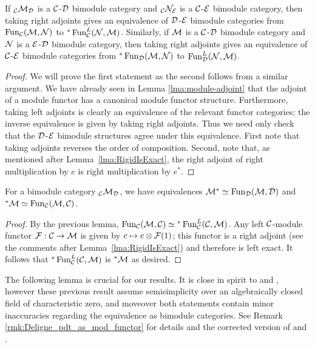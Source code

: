 \documentclass{amsart}
\begin{document}
\begin{lemma}
If ${}_{\mathcal C}\mathcal M_\mathcal D$ is a $\mathcal C$-$\mathcal D$ bimodule category and ${}_{\mathcal C}\mathcal N_\mathcal E$ is a $\mathcal C$-$\mathcal E$ bimodule category, then taking right adjoints gives an equivalence of $\mathcal D$-$\mathcal E$ bimodule categories 
from $\operatorname{Fun}_{\mathcal C}(\mathcal M, \mathcal N)$ to ${}^*\operatorname{Fun}^L_{\mathcal C}(\mathcal N, \mathcal M)$.
Similarly, if $\mathcal M$ is a $\mathcal C$-$\mathcal D$ bimodule category and $\mathcal N$ is a $\mathcal E$-$\mathcal D$ bimodule category, then taking right adjoints gives an equivalence of $\mathcal C$-$\mathcal E$ bimodule categories from ${}^*\operatorname{Fun}_{\mathcal D}(\mathcal M, \mathcal N)$ to $\operatorname{Fun}^L_{\mathcal D}(\mathcal N, \mathcal M)$. 
\end{lemma}
\begin{proof}
	We will prove the first statement as the second follows from a similar argument. 
We have already seen in Lemma \ref{lma:module-adjoint} that the adjoint of a module functor has a canonical module functor structure.  Furthermore, taking left adjoints is clearly an equivalence of the relevant functor categories; the inverse equivalence is given by taking right adjoints. Thus we need only check that the $\mathcal D$-$\mathcal E$ bimodule structures agree under this equivalence.  First note that taking adjoints reverses the order of composition. Second, note that, as mentioned after Lemma~\ref{lma:RigidIsExact}, the right adjoint of right multiplication by $e$ is right multiplication by $e^*$.  
\end{proof}

\begin{lemma} \label{lem:dual-formula-for-adjoints}
For a bimodule category ${}_\mathcal C \mathcal M_\mathcal D$, we have equivalences $\mathcal M^* \simeq \operatorname{Fun}_{\mathcal D}(\mathcal M, \mathcal D)$ and ${}^*\mathcal M \simeq \operatorname{Fun}_{\mathcal C}(\mathcal M, \mathcal C)$.
\end{lemma}
\begin{proof}
By the previous lemma, $\operatorname{Fun}_{\mathcal C}(\mathcal M, \mathcal C) \simeq {}^*\operatorname{Fun}_{\mathcal C}^L(\mathcal C, \mathcal M)$.  Any left $\mathcal C$-module functor $\mathcal F: \mathcal C \rightarrow \mathcal M$ is given by $c \mapsto c \otimes \mathcal F(1)$; this functor is a right adjoint (see the comments after Lemma~\ref{lma:RigidIsExact}) and therefore is left exact.  It follows that ${}^*\operatorname{Fun}_{\mathcal C}^L(\mathcal C, \mathcal M)$ is ${}^* \mathcal M$ as desired.
\end{proof}

The following lemma is crucial for our results. 
It is close in spirit to \cite[Prop. 3.5 and Rmk. 3.6]{0909.3140} and \cite[Thm. 3.20]{0911.4979}, however these previous result assume semisimplicity over an algebraically closed field of characteristic zero, and moveover both statements contain minor inaccuracies regarding the equivalence as bimodule categories. See Remark \ref{rmk:Deligne_pdt_as_mod_functor} for details and the corrected version of \cite[Rmk. 3.6]{0909.3140} and \cite[Thm. 3.20]{0911.4979}.
\end{document}
